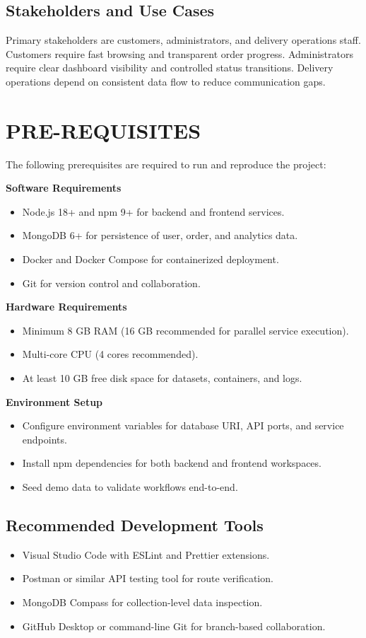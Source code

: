\documentclass[12pt,a4paper]{report}
\begin{document}
\section{Stakeholders and Use Cases}
Primary stakeholders are customers, administrators, and delivery operations staff. Customers require fast browsing and transparent order progress. Administrators require clear dashboard visibility and controlled status transitions. Delivery operations depend on consistent data flow to reduce communication gaps.

\chapter{PRE-REQUISITES}
The following prerequisites are required to run and reproduce the project:

\textbf{Software Requirements}
\begin{itemize}
    \item Node.js 18+ and npm 9+ for backend and frontend services.
    \item MongoDB 6+ for persistence of user, order, and analytics data.
    \item Docker and Docker Compose for containerized deployment.
    \item Git for version control and collaboration.
\end{itemize}

\textbf{Hardware Requirements}
\begin{itemize}
    \item Minimum 8 GB RAM (16 GB recommended for parallel service execution).
    \item Multi-core CPU (4 cores recommended).
    \item At least 10 GB free disk space for datasets, containers, and logs.
\end{itemize}

\textbf{Environment Setup}
\begin{itemize}
    \item Configure environment variables for database URI, API ports, and service endpoints.
    \item Install npm dependencies for both backend and frontend workspaces.
    \item Seed demo data to validate workflows end-to-end.
\end{itemize}

\section{Recommended Development Tools}
\begin{itemize}
    \item Visual Studio Code with ESLint and Prettier extensions.
    \item Postman or similar API testing tool for route verification.
    \item MongoDB Compass for collection-level data inspection.
    \item GitHub Desktop or command-line Git for branch-based collaboration.
\end{itemize}
\end{document}
